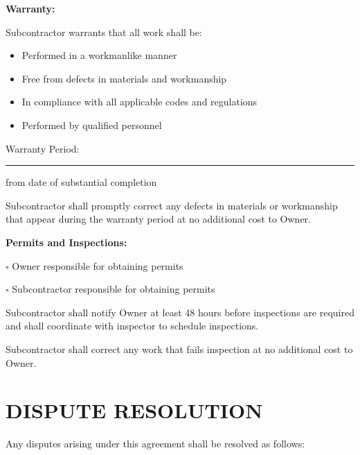\documentclass[11pt,letterpaper]{article}
\begin{document}
\vspace{6pt}

\textbf{Warranty:}

Subcontractor warrants that all work shall be:
\begin{itemize}[leftmargin=0.5in]
\item Performed in a workmanlike manner
\item Free from defects in materials and workmanship
\item In compliance with all applicable codes and regulations
\item Performed by qualified personnel
\end{itemize}

Warranty Period: \rule{5cm}{0.4pt} from date of substantial completion

Subcontractor shall promptly correct any defects in materials or workmanship that appear during the warranty period at no additional cost to Owner.

\vspace{6pt}

\textbf{Permits and Inspections:}

$\square$ Owner responsible for obtaining permits

$\square$ Subcontractor responsible for obtaining permits

Subcontractor shall notify Owner at least 48 hours before inspections are required and shall coordinate with inspector to schedule inspections.

Subcontractor shall correct any work that fails inspection at no additional cost to Owner.

\newpage

\section*{DISPUTE RESOLUTION}

Any disputes arising under this agreement shall be resolved as follows:
\end{document}
